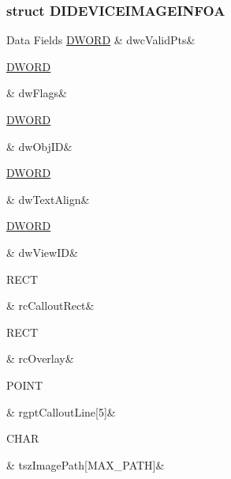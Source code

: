 \subsubsection{struct D\-I\-D\-E\-V\-I\-C\-E\-I\-M\-A\-G\-E\-I\-N\-F\-O\-A}
\begin{DoxyFields}{Data Fields}
\hypertarget{a00003_af9858cc24e795ccd4ca036d6eff605c5}{\hyperlink{a00003_a50e15ae51c87ae06ab29c8148cb5f36c}{D\-W\-O\-R\-D}}\label{a00003_af9858cc24e795ccd4ca036d6eff605c5}
&
dwc\-Valid\-Pts&
\\
\hline

\hypertarget{a00003_a4d2f405b1141000eb2af256e0fc8b98b}{\hyperlink{a00003_a50e15ae51c87ae06ab29c8148cb5f36c}{D\-W\-O\-R\-D}}\label{a00003_a4d2f405b1141000eb2af256e0fc8b98b}
&
dw\-Flags&
\\
\hline

\hypertarget{a00003_aa3e360cabf4f9859e8b8af2111846936}{\hyperlink{a00003_a50e15ae51c87ae06ab29c8148cb5f36c}{D\-W\-O\-R\-D}}\label{a00003_aa3e360cabf4f9859e8b8af2111846936}
&
dw\-Obj\-I\-D&
\\
\hline

\hypertarget{a00003_a47f3a9ec63e7a4ba7849c1b68cc943db}{\hyperlink{a00003_a50e15ae51c87ae06ab29c8148cb5f36c}{D\-W\-O\-R\-D}}\label{a00003_a47f3a9ec63e7a4ba7849c1b68cc943db}
&
dw\-Text\-Align&
\\
\hline

\hypertarget{a00003_a56443b33966d84bee297c53ce5d6485f}{\hyperlink{a00003_a50e15ae51c87ae06ab29c8148cb5f36c}{D\-W\-O\-R\-D}}\label{a00003_a56443b33966d84bee297c53ce5d6485f}
&
dw\-View\-I\-D&
\\
\hline

\hypertarget{a00003_a72a60e5a6f70b986db5ab21a21e74541}{R\-E\-C\-T}\label{a00003_a72a60e5a6f70b986db5ab21a21e74541}
&
rc\-Callout\-Rect&
\\
\hline

\hypertarget{a00003_a8770661a12d52276cdd2b6c00fa20023}{R\-E\-C\-T}\label{a00003_a8770661a12d52276cdd2b6c00fa20023}
&
rc\-Overlay&
\\
\hline

\hypertarget{a00003_a136480dcf2273292cd4126ee415744df}{P\-O\-I\-N\-T}\label{a00003_a136480dcf2273292cd4126ee415744df}
&
rgpt\-Callout\-Line\mbox{[}5\mbox{]}&
\\
\hline

\hypertarget{a00003_aba4b43132169beacaf8b847ce8fedf4c}{C\-H\-A\-R}\label{a00003_aba4b43132169beacaf8b847ce8fedf4c}
&
tsz\-Image\-Path\mbox{[}M\-A\-X\-\_\-\-P\-A\-T\-H\mbox{]}&
\\
\hline

\end{DoxyFields}
\label{d4/d31/a00069}
\hypertarget{a00003_d4/d31/a00069}{}
